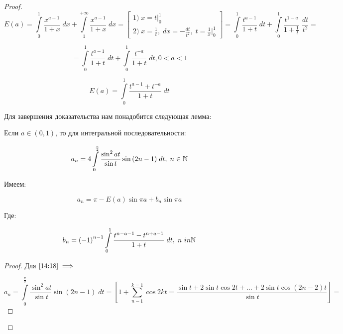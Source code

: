 \documentclass[../../main.tex]{subfiles}
\begin{document}
	\begin{proof}
		\[  E(a) =  \int\limits_{0}^{1}  \frac{x^{a-1}}{1+x} \; dx + 
		\int\limits_{1}^{+\infty} \frac{x^{a-1}}{1+x} \; dx  = \left[  
		\begin{gathered}
	    1) \; x = t \bigg|_{0}^{1} \\
		2) \; 	x = \frac{1}{t}, \; dx = - \frac{dt}{t^2}, \; t = \frac{1}{x}  
		\bigg|_{0}^{1}
		\end{gathered}  \right] = \int\limits_{0}^{1} \frac{t^{a-1}}{1+t} \; dt + 
		\int\limits_{0}^{1} \frac{t^{1-a}}{1+\frac{1}{t}} \; \frac{dt}{t^2} =      \]
		
		\[  = \int\limits_{0}^{1} \frac{t^{a-1}}{1+t} \; dt +  \int\limits_{0}^{1} 
		\frac{t^{-a}}{1+t} \; dt, 0<a<1       \]
		
		\begin{equation}
		\label{14:17}
		  E(a) =  \int\limits_{0}^{1}  \frac{t^{a-1} + t^{-a}}{1+t} \; dt     
		\end{equation}
		
		Для завершения доказательства нам понадобится следующая лемма:
		
		\begin{lemma}
			
			Если $a \in (0,1)$, то для интегральной последовательности:
			
			\begin{equation}
			\label{14:18}
			a_n = 4 \int\limits_{0}^{\frac{\pi}{2}} \frac{\sin^2{at}}{\sin{t}} 
			\sin{\left(2n-1 \right) } \; dt, \; n \in \mathbb{N}
			\end{equation}
			
			Имеем:
			
			\begin{equation}
			\label{14:19}
			a_n = \pi - E(a) \sin{\pi a} + b_n \sin{\pi a}
			\end{equation}
			
			Где:
			
			\begin{equation}
			\label{14:20}
			b_n = \left( - 1 \right)^{n-1} \int\limits_{0}^{1} \frac{t^{n-a-1} - 
			t^{n+a-1} }{1+t} \; dt, \; n\ in \mathbb{N}
			\end{equation}
		\end{lemma}	
			\begin{proof}
				Для $\eqref{14:18} \implies $
				
				\[   a_n =  \int\limits_{0}^{\frac{\pi}{2}} \frac{\sin^2{at}}{\sin{t}} 
				\sin{\left(2n-1 \right) } \; dt = \left[ 1 + \sum_{n-1}^{k = 1} \cos{2k t} 
				= \frac{\sin{t} + 2 \sin{t} \cos{2t} + \dots + 2\sin{t} \cos{(2n - 
				2)t}}{\sin{t}} \right]   =   \]
				

\end{proof}
\end{proof}
\end{document}

